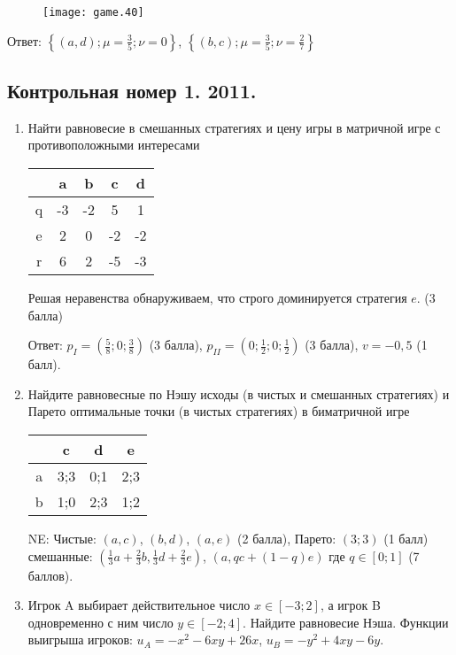 \documentclass[pdftex,12pt,a4paper]{article}
\begin{document}
\begin{enumerate}
\begin{figure}[htbp]
    \texttt{[image: game.40]}
\end{figure}

Ответ: $\left\{(a,d); \mu=\frac{3}{5}; \nu=0\right\}$, 
$\left\{(b,c); \mu=\frac{3}{5}; \nu=\frac{2}{7}\right\}$
\end{enumerate}

\subsection{Контрольная номер 1. 2011.} 
\begin{enumerate}

\item Найти равновесие в смешанных стратегиях и цену игры в матричной игре с противоположными интересами

\begin{tabular}{c|cccc}
 & a & b & c & d \\ 
\hline 
q & -3 & -2 & 5 & 1 \\ 
e & 2 & 0 & -2 & -2 \\ 
r & 6 & 2 & -5 & -3 \\ 
\end{tabular} 



Решая неравенства обнаруживаем, что строго доминируется стратегия $e$. (3 балла)

Ответ: $p_{I}=(\frac{5}{8};0;\frac{3}{8})$ (3 балла), $p_{II}=(0;\frac{1}{2};0;\frac{1}{2})$ (3 балла), $v=-0{,}5$ (1 балл).

\item Найдите равновесные по Нэшу исходы (в чистых и смешанных стратегиях) и Парето оптимальные точки (в чистых стратегиях) в биматричной игре

\begin{tabular}{c|ccc}
 & c & d & e \\ 
\hline 
a & 3;3 & 0;1 & 2;3 \\ 
b & 1;0 & 2;3 & 1;2 \\ 
\end{tabular} 


NE: Чистые: $(a,c)$, $(b,d)$, $(a,e)$ (2 балла), Парето: $(3;3)$ (1 балл) \\
смешанные: $(\frac{1}{3}a+\frac{2}{3}b,\frac{1}{3}d+\frac{2}{3}e)$, $(a,qc+(1-q)e)$ где $q\in [0;1]$ (7 баллов). 

\item Игрок A выбирает действительное число $x\in [-3;2]$, а игрок B одновременно с ним число $y\in [-2;4]$. Найдите равновесие Нэша. Функции выигрыша игроков: $u_A=-x^2-6xy+26x$, $u_B=-y^2+4xy-6y$.


\end{enumerate}
\end{document}
